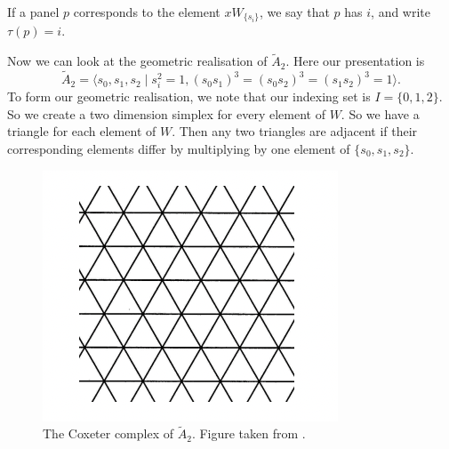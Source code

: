 \documentclass[11pt]{article}
\begin{document}





\begin{definition}
    If a panel $p$ corresponds to the element $xW_{\{s_i\}}$, we say that $p$ has  $i$, and write $\tau(p)=i$. 
\end{definition}




Now we can look at the geometric realisation of $\tilde{A}_2$. Here our presentation is
 \[\tilde{A}_2=\langle s_0,s_1,s_2\mid s_i^2=1, (s_0s_1)^3=(s_0s_2)^3=(s_1s_2)^3=1\rangle.\]
To form our geometric realisation, we note that our indexing set is $I=\{0,1,2\}$. So we create a two dimension simplex for every element of $W$. So we have a triangle for each element of $W$. Then any two triangles are adjacent if their corresponding elements differ by multiplying by one element of $\{s_0,s_1,s_2\}$. 
\begin{figure}[!htbp]
    
    \begin{center}
        \includegraphics[scale=0.9]{Screenshot 2023-04-18 at 17.57.13.png}
    \end{center}
    \caption{The Coxeter complex of $\tilde{A}_2$. Figure taken from \cite[p.9]{COMB}.}
\end{figure}
\end{document}
